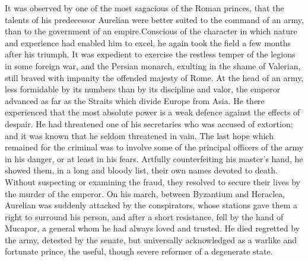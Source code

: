 It was observed by one of the most sagacious of the Roman
princes, that the talents of his predecessor Aurelian were better
suited to the command of an army, than to the government of an
empire.\footnotemark[95] Conscious of the character in which nature and
experience had enabled him to excel, he again took the field a
few months after his triumph. It was expedient to exercise the
restless temper of the legions in some foreign war, and the
Persian monarch, exulting in the shame of Valerian, still braved
with impunity the offended majesty of Rome. At the head of an
army, less formidable by its numbers than by its discipline and
valor, the emperor advanced as far as the Straits which divide
Europe from Asia. He there experienced that the most absolute
power is a weak defence against the effects of despair. He had
threatened one of his secretaries who was accused of extortion;
and it was known that he seldom threatened in vain. The last hope
which remained for the criminal was to involve some of the
principal officers of the army in his danger, or at least in his
fears. Artfully counterfeiting his master’s hand, he showed them,
in a long and bloody list, their own names devoted to death.
Without suspecting or examining the fraud, they resolved to
secure their lives by the murder of the emperor. On his march,
between Byzantium and Heraclea, Aurelian was suddenly attacked by
the conspirators, whose stations gave them a right to surround
his person, and after a short resistance, fell by the hand of
Mucapor, a general whom he had always loved and trusted. He died
regretted by the army, detested by the senate, but universally
acknowledged as a warlike and fortunate prince, the useful,
though severe reformer of a degenerate state.\footnotemark[96]



